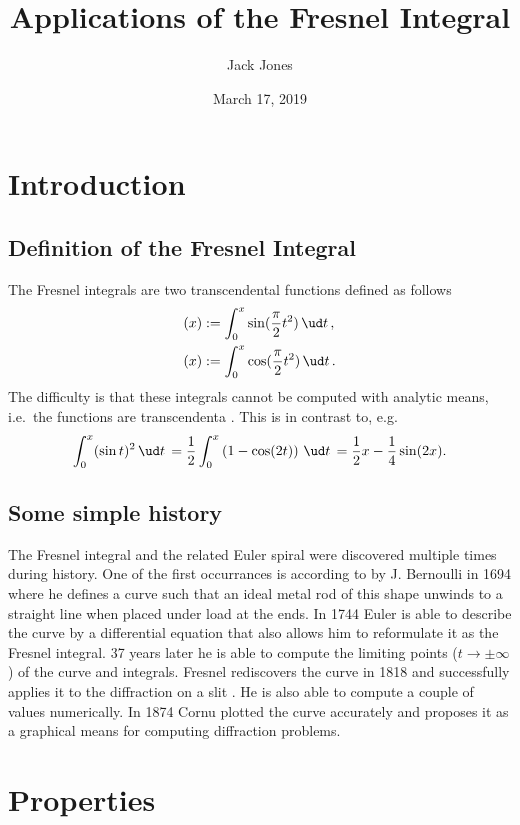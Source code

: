 \documentclass[12pt]{article}
\title{Applications of the Fresnel Integral}
\author{Jack Jones}
\date{March 17\th, 2019}
\let\C=\relax
\DeclareMathOperator\C{C} %
\def\d#1{{\,\ud#1\,}}
\let\S=\relax
\DeclareMathOperator\S{S} %
\begin{document}
\maketitle
\begin{abstract}
	
\end{abstract}
\clearpage


\section{Introduction}

\subsection{Definition of the Fresnel Integral}
The Fresnel integrals are two transcendental functions defined as follows
\begin{align}
  \S(x) &:= \int_0^x  \sin(\frac\pi2 t^2) \d{t}, \\
  \C(x) &:= \int_0^x \cos(\frac\pi2 t^2) \d{t}.
\end{align}
The difficulty is that these integrals cannot be computed with analytic means, i.e.~the functions are transcendenta \cite[p.195ff]{AS}.  This is in contrast to, e.g.
$$ \int_0^x (\sin t)^2 \d{t} = \frac12\int_0^x \left(1-\cos(2t)\right)\d{t} = \frac12x -\frac14\sin(2x).
$$

\subsection{Some simple history}
The Fresnel integral and the related Euler spiral were discovered multiple times during history.  One of the first occurrances is according to \cite{Lev08} by J. Bernoulli in 1694 where he defines a curve such that an ideal metal rod of this shape unwinds to a straight line when placed under load at the ends.  In 1744 Euler is able to describe the curve by a differential equation that also allows him to reformulate it as the Fresnel integral.  37 years later he is able to compute the limiting points ($t\to\pm\infty$) of the curve and integrals.  Fresnel rediscovers the curve in 1818 and successfully applies it to the diffraction on a slit \cite{Lev08}.  He is also able to compute a couple of values numerically.  In 1874 Cornu plotted the curve accurately and proposes it as a graphical means for computing diffraction problems.


\section{Properties}
\end{document}
